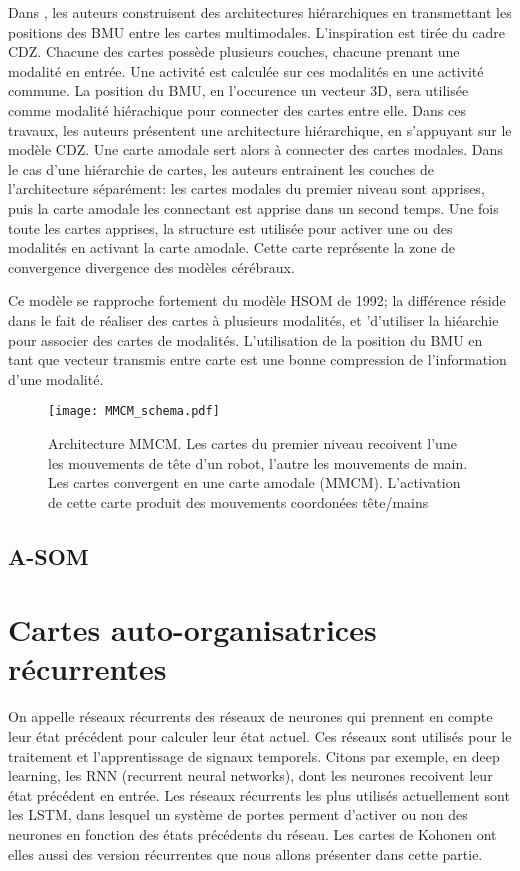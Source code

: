 Dans \cite{dominey13}, les auteurs construisent des architectures hiérarchiques en transmettant les positions des BMU entre les cartes multimodales. L'inspiration est tirée du cadre CDZ.
Chacune des cartes possède plusieurs couches, chacune prenant une modalité en entrée. Une activité est calculée sur ces modalités en une activité commune. La position du BMU, en l'occurence un vecteur 3D, sera utilisée comme modalité hiérachique pour connecter des cartes entre elle. Dans ces travaux, les auteurs présentent une architecture hiérarchique, en s'appuyant sur le modèle CDZ. Une carte amodale sert alors à connecter des cartes modales.
Dans le cas d'une hiérarchie de cartes, les auteurs entrainent les couches de l'architecture séparément: les cartes modales du premier niveau sont apprises, puis la carte amodale les connectant est apprise dans un second temps. 
Une fois toute les cartes apprises, la structure est utilisée pour activer une ou des modalités en activant la carte amodale. Cette carte représente la zone de convergence divergence des modèles cérébraux. 

Ce modèle se rapproche fortement du modèle HSOM de 1992; la différence réside dans le fait de réaliser des cartes à plusieurs modalités, et 'd'utiliser la hiéarchie pour associer des cartes de modalités. 
L'utilisation de la position du BMU en tant que vecteur transmis entre carte est une bonne compression de l'information d'une modalité.

\begin{figure}
    \centering
    \texttt{[image: MMCM\_schema.pdf]}
    \caption{Architecture MMCM. Les cartes du premier niveau recoivent l'une les mouvements de tête d'un robot, l'autre les mouvements de main. Les cartes convergent en une carte amodale (MMCM). L'activation de cette carte produit des mouvements coordonées tête/mains~\cite{dominey13}\label{fig:mmcm}}
\end{figure}

\subsection{A-SOM}





\section{Cartes auto-organisatrices récurrentes}

On appelle réseaux récurrents des réseaux de neurones qui prennent en compte leur état précédent pour calculer leur état actuel. Ces réseaux sont utilisés pour le traitement et l'apprentissage de signaux temporels. Citons par exemple, en deep learning, les RNN (recurrent neural networks), dont les neurones recoivent leur état précédent en entrée. Les réseaux récurrents les plus utilisés actuellement sont les LSTM, dans lesquel un système de portes perment d'activer ou non des neurones en fonction des états précédents du réseau. Les cartes de Kohonen ont elles aussi des version récurrentes que nous allons présenter dans cette partie.

